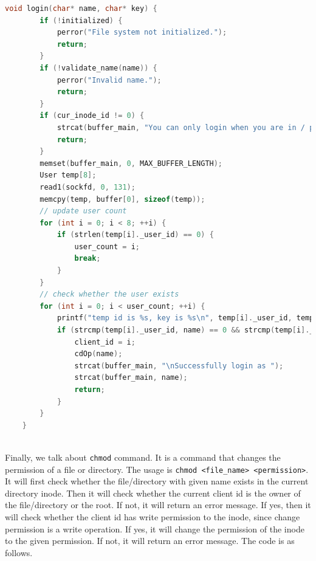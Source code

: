 \begin{lstlisting}[language=C]
    void login(char* name, char* key) {
        if (!initialized) {
            perror("File system not initialized.");
            return;
        }
        if (!validate_name(name)) {
            perror("Invalid name.");
            return;
        }
        if (cur_inode_id != 0) {
            strcat(buffer_main, "You can only login when you are in / path");
            return;
        }
        memset(buffer_main, 0, MAX_BUFFER_LENGTH);
        User temp[8];
        read1(sockfd, 0, 131);
        memcpy(temp, buffer[0], sizeof(temp));
        // update user count
        for (int i = 0; i < 8; ++i) {
            if (strlen(temp[i]._user_id) == 0) {
                user_count = i;
                break;
            }
        }
        // check whether the user exists
        for (int i = 0; i < user_count; ++i) {
            printf("temp id is %s, key is %s\n", temp[i]._user_id, temp[i]._user_key);
            if (strcmp(temp[i]._user_id, name) == 0 && strcmp(temp[i]._user_key, key) == 0) {
                client_id = i;
                cdOp(name);
                strcat(buffer_main, "\nSuccessfully login as ");
                strcat(buffer_main, name);
                return;
            }
        }
    }
        
\end{lstlisting}

Finally, we talk about \texttt{chmod} command. It is a command that changes the permission of a file or directory. The usage is \texttt{chmod <file\_name> <permission>}.
It will first check whether the file/directory with given name exists in the current directory inode. Then it will check whether the current client id is the owner of the file/directory or the root.
If not, it will return an error message. If yes, then it will check whether the client id has write permission to the inode, since change permission is a write operation. If yes, it will change the permission of the inode to the given permission. If not, it will return an error message. The code is as follows.

